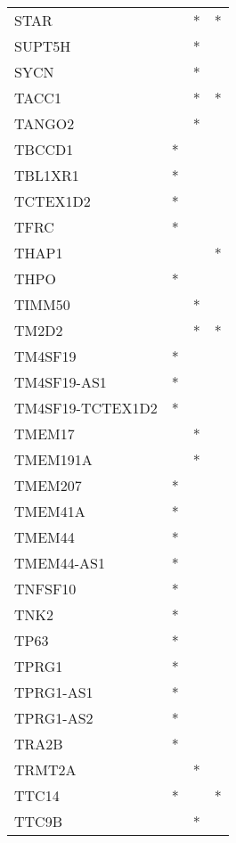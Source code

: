 \begin{longtable}{lccc}
STAR             &       &  * &       * \\
SUPT5H           &       &  * &         \\
SYCN             &       &  * &         \\
TACC1            &       &  * &       * \\
TANGO2           &       &  * &         \\
TBCCD1           &     * &    &         \\
TBL1XR1          &     * &    &         \\
TCTEX1D2         &     * &    &         \\
TFRC             &     * &    &         \\
THAP1            &       &    &       * \\
THPO             &     * &    &         \\
TIMM50           &       &  * &         \\
TM2D2            &       &  * &       * \\
TM4SF19          &     * &    &         \\
TM4SF19-AS1      &     * &    &         \\
TM4SF19-TCTEX1D2 &     * &    &         \\
TMEM17           &       &  * &         \\
TMEM191A         &       &  * &         \\
TMEM207          &     * &    &         \\
TMEM41A          &     * &    &         \\
TMEM44           &     * &    &         \\
TMEM44-AS1       &     * &    &         \\
TNFSF10          &     * &    &         \\
TNK2             &     * &    &         \\
TP63             &     * &    &         \\
TPRG1            &     * &    &         \\
TPRG1-AS1        &     * &    &         \\
TPRG1-AS2        &     * &    &         \\
TRA2B            &     * &    &         \\
TRMT2A           &       &  * &         \\
TTC14            &     * &    &       * \\
TTC9B            &       &  * &         \\

\end{longtable}

